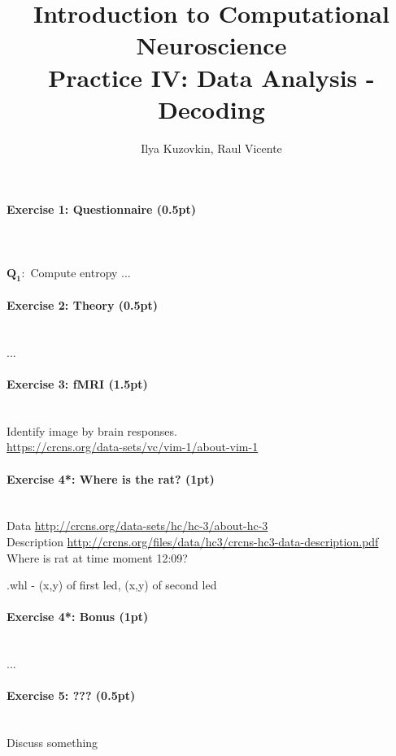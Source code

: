 \documentclass[a4paper,11pt]{article}
\author{\large{Ilya Kuzovkin, Raul Vicente}}
\title{\huge{Introduction to Computational Neuroscience}\\\LARGE{Practice IV: Data Analysis - Decoding}}
\newenvironment{exercise}[3]{\paragraph{Exercise #1: #2 (#3pt)}\ \\}{
\medskip}
\newcommand{\question}[2]{\setlength\parindent{0mm}\ \\$\mathbf{Q_#1:}$ #2\ \\}
\begin{document}
\maketitle

\begin{exercise}{1}{Questionnaire}{0.5}
\question{1}{Compute entropy ...}
\end{exercise}

\begin{exercise}{2}{Theory}{0.5}
...
\end{exercise}

\begin{exercise}{3}{fMRI}{1.5}
Identify image by brain responses.\\
\url{https://crcns.org/data-sets/vc/vim-1/about-vim-1}

\end{exercise}


\begin{exercise}{4*}{Where is the rat?}{1}
Data \url{http://crcns.org/data-sets/hc/hc-3/about-hc-3}\\
Description \url{http://crcns.org/files/data/hc3/crcns-hc3-data-description.pdf}\\
Where is rat at time moment 12:09?

.whl - (x,y) of first led, (x,y) of second led
\end{exercise}


\begin{exercise}{4*}{Bonus}{1}
...
\end{exercise}

\begin{exercise}{5}{???}{0.5}
Discuss something
\end{exercise}
\end{document}
